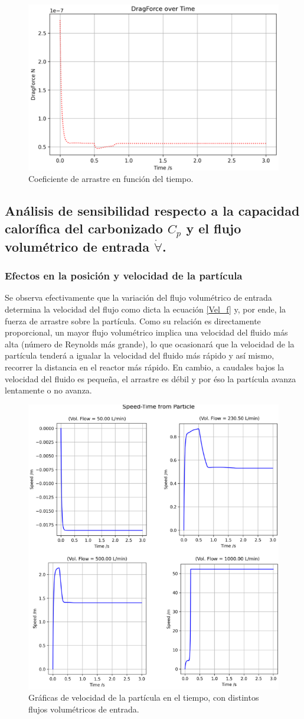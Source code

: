 \documentclass[11pt,stdletter,orderfromtodate,sigleft,twoside]{report}
\begin{document}
\begin{figure}[H]
    \centering
    \includegraphics[width=0.5\linewidth]{figures/Cte7.png}
    \caption{Coeficiente de arrastre en función del tiempo.}
    \label{fig:enter-label}
\end{figure}


\subsection{Análisis de sensibilidad respecto a la capacidad calorífica del carbonizado $C_p$ y el flujo
volumétrico de entrada $\dot{\forall}$.}



\subsubsection{Efectos en la posición y velocidad de la partícula}

Se observa efectivamente que la variación del flujo volumétrico de entrada determina la velocidad del flujo como dicta la ecuación \ref{Vel_f} y, por ende, la fuerza de arrastre sobre la partícula. Como su relación es directamente proporcional, un mayor flujo volumétrico implica una velocidad del fluido más alta (número de Reynolds más grande), lo que ocasionará que la velocidad de la partícula tenderá a igualar la velocidad del fluido más rápido y así mismo, recorrer la distancia en el reactor más rápido. En cambio, a caudales bajos la velocidad del fluido es pequeña, el arrastre es débil y por éso la partícula avanza lentamente o no avanza.

\begin{figure}[H]
    \centering
    \includegraphics[width=0.6\linewidth]{figures/VelV.png}
    \caption{Gráficas de velocidad de la partícula en el tiempo, con distintos flujos volumétricos de entrada.}
    \label{fig:enter-label}
\end{figure}
\end{document}
